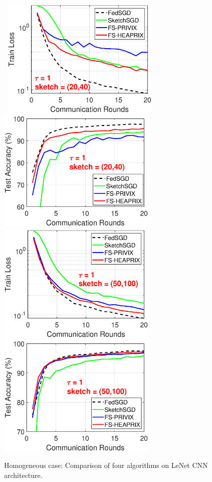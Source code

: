 \begin{figure}[ht]
	\begin{center}
		\mbox{			    \includegraphics[width=3in]{MNIST_figures/local1_sketch20_iid1_train_loss.eps}
		\includegraphics[width=3in]{MNIST_figures/local1_sketch20_iid1_test_acc.eps}
		}
		\mbox{
		\includegraphics[width=3in]{MNIST_figures/local1_sketch50_iid1_train_loss.eps}
		\includegraphics[width=3in]{MNIST_figures/local1_sketch50_iid1_test_acc.eps}
		}
	\end{center}
	\caption{Homogeneous case: Comparison of four algorithms on LeNet CNN architecture.}
    \label{fig:MNIST-tau1}
\end{figure}

